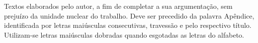 \begin{center}
	\label{ApendiceA}
\end{center}

Textos elaborados pelo autor, a fim de completar a sua argumentação, sem prejuízo da unidade nuclear do trabalho. Deve ser precedido da palavra Apêndice, identificada por letras maiúsculas consecutivas, travessão e pelo respectivo título. Utilizam-se letras maiúsculas dobradas quando esgotadas as letras do alfabeto.

\clearpage